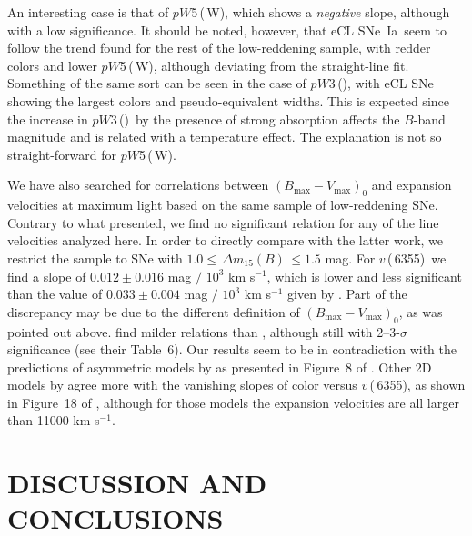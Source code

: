 \documentclass[apj]{emulateapj-rtx4}
\newcommand{\pwthree}{$pW$3\,(\ion{Mg}{2})}
\newcommand{\pwfive}{$pW$5\,(\ion{S}{2}\,W)}
\newcommand{\vsix}{$v$\,(\ion{Si}{2}\,6355)}
\newcommand{\dm}{$\Delta m_{15}(B)$}
\newcommand{\sneia}{SNe~Ia}
\begin{document}
An interesting case is that of \pwfive, which shows a {\em negative}
slope, although with a low significance. It should be noted, however, that
eCL \sneia\ seem to follow the trend found for the rest of the
low-reddening sample, with redder colors and lower \pwfive, although
deviating from the straight-line fit. Something of the same sort can
be seen in the case of \pwthree, with eCL SNe showing the largest
colors and pseudo-equivalent widths. This is expected since the
increase in \pwthree\ by the presence of strong 
absorption affects the $B$-band magnitude and is related with a
temperature effect. The explanation is not so straight-forward for \pwfive.

We have also searched for correlations between
$(B_{\mathrm{max}}-V_{\mathrm{max}})_0$ and expansion velocities at
maximum light based on the same sample of low-reddening SNe. Contrary
to what \citet{foley11b} presented, we find no significant relation
for any of the line velocities analyzed here. In order to
directly compare with the latter work, we restrict the sample to SNe with
  $1.0\leq$\,\dm\,$\leq 1.5$ mag. For \vsix\ we find a
slope of $0.012 \pm 0.016$ mag $/$ $10^3$ km s$^{-1}$, which is
lower and less significant than the value of $0.033 \pm 0.004$ mag
$/$ $10^3$ km s$^{-1}$ given by \citet{foley11b}. 
Part of the discrepancy may be due to the different definition of
$(B_{\mathrm{max}}-V_{\mathrm{max}})_0$, as was pointed out above. 
\citet{blondin12} find milder relations than \citet{foley11b},
although still with 2--3-$\sigma$ significance (see their Table~6).
Our results seem to be in contradiction with the predictions of
asymmetric models by \citet{kasen07b} as presented in Figure~8 of
\citet{foley11a}. Other 2D models by \citet{kasen09} agree more with
the vanishing slopes of color versus \vsix, as shown in Figure~18 of
\citet{blondin11b}, although for those models the expansion velocities
are all larger than 11000 km s$^{-1}$.

\section{DISCUSSION AND CONCLUSIONS}
\label{sec:concl}
\end{document}
